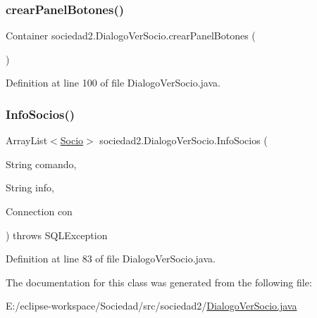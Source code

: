 \subsubsection{\texorpdfstring{crear\+Panel\+Botones()}{crearPanelBotones()}}
{\footnotesize\ttfamily Container sociedad2.\+Dialogo\+Ver\+Socio.\+crear\+Panel\+Botones (\begin{DoxyParamCaption}{ }\end{DoxyParamCaption})}



Definition at line 100 of file Dialogo\+Ver\+Socio.\+java.

\mbox{\label{classsociedad2_1_1_dialogo_ver_socio_aa6ecfb71916851860dd14056bc201f11}} 
\subsubsection{\texorpdfstring{Info\+Socios()}{InfoSocios()}}
{\footnotesize\ttfamily Array\+List$<$\mbox{\hyperlink{classsociedad2_1_1_socio}{Socio}}$>$ sociedad2.\+Dialogo\+Ver\+Socio.\+Info\+Socios (\begin{DoxyParamCaption}\item[{String}]{comando,  }\item[{String}]{info,  }\item[{Connection}]{con }\end{DoxyParamCaption}) throws S\+Q\+L\+Exception}



Definition at line 83 of file Dialogo\+Ver\+Socio.\+java.



The documentation for this class was generated from the following file\+:\begin{DoxyCompactItemize}
\item 
E\+:/eclipse-\/workspace/\+Sociedad/src/sociedad2/\mbox{\hyperlink{_dialogo_ver_socio_8java}{Dialogo\+Ver\+Socio.\+java}}\end{DoxyCompactItemize}
